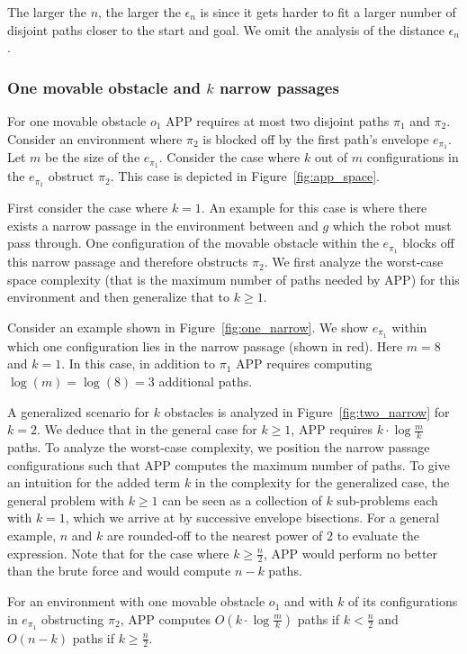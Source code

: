\documentclass[a4paper]{report}
\begin{document}
The larger the $n$, the larger the $\epsilon_n$ is since it gets harder to fit a larger number of disjoint paths closer to the start and goal. We omit the analysis of the distance $\epsilon_n$.

\subsubsection{One movable obstacle and $k$ narrow passages}
For one movable obstacle $o_1$ APP requires at most two disjoint paths $\pi_1$ and $\pi_2$. Consider an environment where $\pi_2$ is blocked off by the first path's envelope $e_{\pi_1}$. Let $m$ be the size of the $e_{\pi_1}$. Consider the case where $k$ out of $m$ configurations in the $e_{\pi_1}$ obstruct $\pi_2$. This case is depicted in Figure~\ref{fig:app_space}.

First consider the case where $k=1$. An example for this case is where there exists a narrow passage in the environment between \Sstart and $g$ which the robot must pass through. One configuration of the movable obstacle within the $e_{\pi_1}$ blocks off this narrow passage and therefore obstructs $\pi_2$. We first analyze the worst-case space complexity (that is the maximum number of paths needed by APP) for this environment and then generalize that to $k \geq 1$.

Consider an example shown in Figure~\ref{fig:one_narrow}. We show $e_{\pi_1}$ within which one configuration lies in the narrow passage (shown in red). Here $m=8$ and $k=1$. In this case, in addition to $\pi_1$ APP requires computing $\log (m) = \log (8) = 3$ additional paths.

A generalized scenario for $k$ obstacles is analyzed in Figure~\ref{fig:two_narrow} for $k = 2$. We deduce that in the general case for $k \geq 1$, APP requires $k \cdot \log\frac{m}{k}$ paths. To analyze the worst-case complexity, we position the narrow passage configurations such that APP computes the maximum number of paths. To give an intuition for the added term $k$ in the complexity for the generalized case, the general problem with $k \geq 1$ can be seen as a collection of $k$ sub-problems each with $k = 1$, which we arrive at by successive envelope bisections. For a general example, $n$ and $k$ are rounded-off to the nearest power of 2 to evaluate the expression. Note that for the case where $k \geq \frac{n}{2}$, APP would perform no better than the brute force and would compute $n-k$ paths. 

\vspace{2mm}
\begin{lemma}
For an environment with one movable obstacle $o_1$ and with $k$ of its configurations in $e_{\pi_1}$ obstructing $\pi_2$, APP computes $O(k \cdot \log \frac{m}{k})$ paths if $k < \frac{n}{2}$ and $O(n-k)$ paths if $k \geq \frac{n}{2}$.
\end{lemma}
\end{document}
